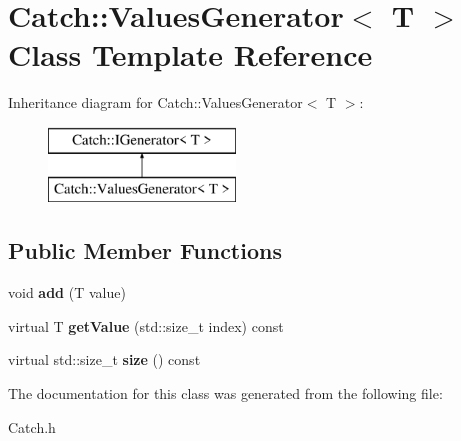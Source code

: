 \hypertarget{class_catch_1_1_values_generator}{\section{Catch\-:\-:Values\-Generator$<$ T $>$ Class Template Reference}
\label{class_catch_1_1_values_generator}
}
Inheritance diagram for Catch\-:\-:Values\-Generator$<$ T $>$\-:\begin{figure}[H]
\begin{center}
\leavevmode
\includegraphics[height=2.000000cm]{class_catch_1_1_values_generator}
\end{center}
\end{figure}
\subsection*{Public Member Functions}
\begin{DoxyCompactItemize}
\item 
\hypertarget{class_catch_1_1_values_generator_a8412c8ce5d9d4fc6ff06d5246d56d538}{void {\bfseries add} (T value)}\label{class_catch_1_1_values_generator_a8412c8ce5d9d4fc6ff06d5246d56d538}

\item 
\hypertarget{class_catch_1_1_values_generator_a60599dd67096ff108471f64ee42acd9d}{virtual T {\bfseries get\-Value} (std\-::size\-\_\-t index) const }\label{class_catch_1_1_values_generator_a60599dd67096ff108471f64ee42acd9d}

\item 
\hypertarget{class_catch_1_1_values_generator_a98a80bb0dd682c44e82e4a75e98c4682}{virtual std\-::size\-\_\-t {\bfseries size} () const }\label{class_catch_1_1_values_generator_a98a80bb0dd682c44e82e4a75e98c4682}

\end{DoxyCompactItemize}


The documentation for this class was generated from the following file\-:\begin{DoxyCompactItemize}
\item 
Catch.\-h\end{DoxyCompactItemize}
